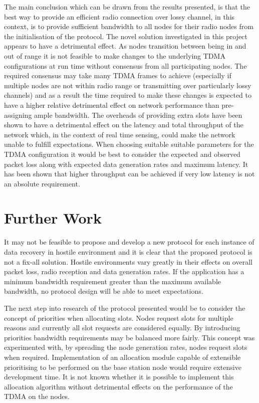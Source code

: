 \documentclass[parskip]{cs4rep}
\begin{document}
The main conclusion which can be drawn from the results presented, is that the best way to provide an efficient radio connection over lossy channel, in this context, is to provide sufficient bandwidth to all nodes for their radio nodes from the initialisation of the protocol. The novel solution investigated in this project appears to have a detrimental effect. As nodes transition between being in and out of range it is not feasible to make changes to the underlying TDMA configurations at run time without consensus from all participating nodes. The required consensus may take many TDMA frames to achieve (especially if multiple nodes are not within radio range or transmitting over particularly lossy channels) and as a result the time required to make these changes is expected to have a higher relative detrimental effect on network performance than pre-assigning ample bandwidth. The overheads of providing extra slots have been shown to have a detrimental effect on the latency and total throughput of the network which, in the context of real time sensing, could make the network unable to fulfill expectations. When choosing suitable suitable parameters for the TDMA configuration it would be best to consider the expected and observed packet loss along with expected data generation rates and maximum latency. It has been shown that higher throughput can be achieved if very low latency is not an absolute requirement.

\newpage
\section{Further Work}

It may not be feasible to propose and develop a new protocol for each instance of data recovery in hostile environment and it is clear that the proposed protocol is not a fix-all solution. Hostile environments vary greatly in their effects on overall packet loss, radio reception and data generation rates. If the application has a minimum bandwidth requirement greater than the maximum available bandwidth, no protocol design will be able to meet expectations. 

The next step into research of the protocol presented would be to consider the concept of priorities when allocating slots. Nodes request slots for multiple reasons and currently all slot requests are considered equally. By introducing priorities bandwidth requirements may be balanced more fairly. This concept was experimented with, by spreading the node generation rates, nodes request slots when required. Implementation of an allocation module capable of extensible prioritising to be performed on the base station node would require extensive development time. It is not known whether it is possible to implement this allocation algorithm without detrimental effects on the performance of the TDMA on the nodes. 
\end{document}
